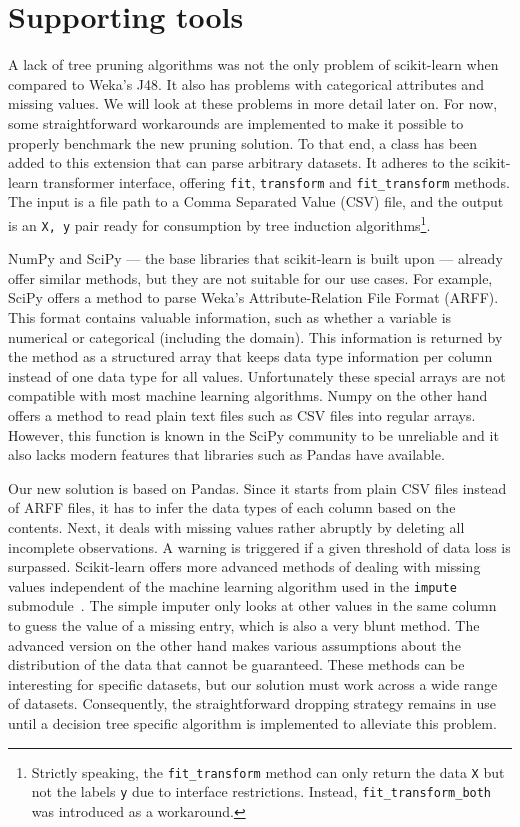 \section{Supporting tools}\label{sec:csvimporter}
A lack of tree pruning algorithms was not the only problem of scikit-learn when compared to Weka's J48. It also has problems with categorical attributes and missing values. We will look at these problems in more detail later on. For now, some straightforward workarounds are implemented to make it possible to properly benchmark the new pruning solution. To that end, a  class has been added to this extension that can parse arbitrary datasets. It adheres to the scikit-learn transformer interface, offering \texttt{fit}, \texttt{transform} and \texttt{fit\_transform} methods. The input is a file path to a Comma Separated Value (CSV) file, and the output is an \texttt{X, y} pair ready for consumption by tree induction algorithms\footnote{Strictly speaking, the \texttt{fit\_transform} method can only return the data \texttt{X} but not the labels \texttt{y} due to interface restrictions. Instead, \texttt{fit\_transform\_both} was introduced as a workaround.}.

NumPy and SciPy --- the base libraries that scikit-learn is built upon --- already offer similar methods, but they are not suitable for our use cases. For example, SciPy offers a method to parse Weka's Attribute-Relation File Format (ARFF). This format contains valuable information, such as whether a variable is numerical or categorical (including the domain). This information is returned by the method as a structured array that keeps data type information per column instead of one data type for all values. Unfortunately these special arrays are not compatible with most machine learning algorithms. Numpy on the other hand offers a method to read plain text files such as CSV files into regular arrays. However, this function is known in the SciPy community to be unreliable and it also lacks modern features that libraries such as Pandas have available.

Our new solution is based on Pandas. Since it starts from plain CSV files instead of ARFF files, it has to infer the data types of each column based on the contents. Next, it deals with missing values rather abruptly by deleting all incomplete observations. A warning is triggered if a given threshold of data loss is surpassed. Scikit-learn offers more advanced methods of dealing with missing values independent of the machine learning algorithm used in the \texttt{impute} submodule~\cite{imputation}. The simple imputer only looks at other values in the same column to guess the value of a missing entry, which is also a very blunt method. The advanced version on the other hand makes various assumptions about the distribution of the data that cannot be guaranteed. These methods can be interesting for specific datasets, but our solution must work across a wide range of datasets. Consequently, the straightforward dropping strategy remains in use until a decision tree specific algorithm is implemented to alleviate this problem.


